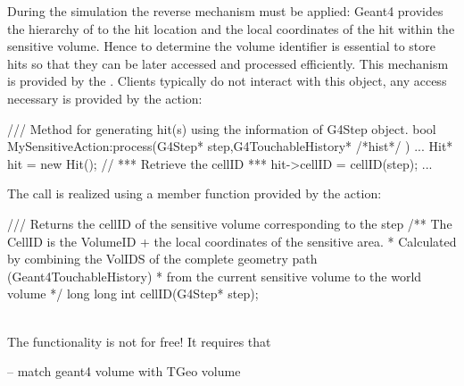 \documentclass[10pt,a4paper]{article}
\begin{document}
\noindent 
During the simulation the reverse mechanism must be applied: Geant4 provides
the hierarchy of  to the hit location and the local coordinates
of the hit within the sensitive volume. Hence to determine the volume identifier
is essential to store hits so that they can be later accessed and processed efficiently.
This mechanism is provided by the . Clients typically do not
interact with this object, any access necessary is provided by the
 action:
\begin{unnumberedcode}
  /// Method for generating hit(s) using the information of G4Step object.
  bool MySensitiveAction:process(G4Step* step,G4TouchableHistory* /*hist*/ ) {
    ...
    Hit* hit = new Hit();
    // *** Retrieve the cellID  ***
    hit->cellID = cellID(step);
    ...
  }
\end{unnumberedcode}
The call is realized using a member function provided by the 
 action:
\begin{unnumberedcode}
  /// Returns the cellID of the sensitive volume corresponding to the step
  /** The CellID is the VolumeID + the local coordinates of the sensitive area.
   *  Calculated by combining the VolIDS of the complete geometry path (Geant4TouchableHistory)
   *  from the current sensitive volume to the world volume
   */
  long long int cellID(G4Step* step);
\end{unnumberedcode}

\noindent
{}\\
The  functionality is not for free! It requires that


\noindent
-- match geant4 volume with TGeo volume

\end{document}
